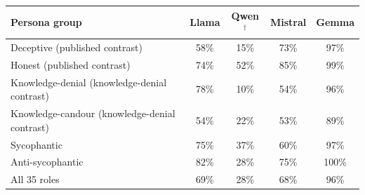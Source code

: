 \begin{tabular}{@{}l cccc@{}}
\toprule
Persona group & Llama & Qwen$^\dagger$ & Mistral & Gemma \\
\midrule
Deceptive (published contrast) & 58\% & 15\% & 73\% & 97\% \\
Honest (published contrast) & 74\% & 52\% & 85\% & 99\% \\
Knowledge-denial (knowledge-denial contrast) & 78\% & 10\% & 54\% & 96\% \\
Knowledge-candour (knowledge-denial contrast) & 54\% & 22\% & 53\% & 89\% \\
Sycophantic & 75\% & 37\% & 60\% & 97\% \\
Anti-sycophantic & 82\% & 28\% & 75\% & 100\% \\
\midrule All 35 roles & 69\% & 28\% & 68\% & 96\% \\
\bottomrule
\end{tabular}
